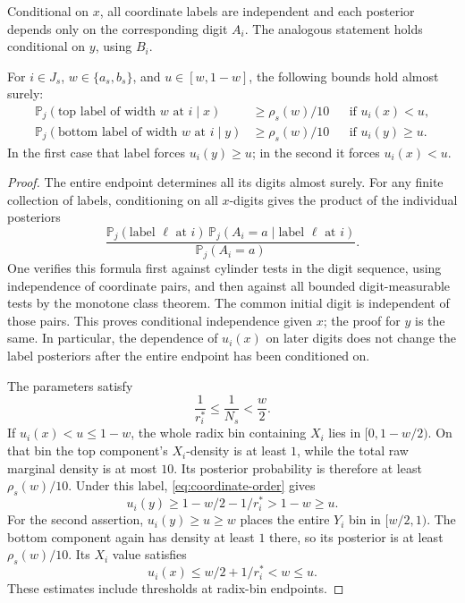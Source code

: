 \begin{lemma}
\label{lem:conditional-labels}
Conditional on $x$, all coordinate labels are independent and each
posterior depends only on the corresponding digit $A_i$. The analogous
statement holds conditional on $y$, using $B_i$.

For $i\in J_s$, $w\in\{a_s,b_s\}$, and $u\in[w,1-w]$, the following
bounds hold almost surely:
\begin{align}
 \mathbb P_j(\text{top label of width }w\text{ at }i\mid x)
   &\ge\rho_s(w)/10 &&\text{if }u_i(x)<u,
   \label{eq:conditional-crossing}\\
 \mathbb P_j(\text{bottom label of width }w\text{ at }i\mid y)
   &\ge\rho_s(w)/10 &&\text{if }u_i(y)\ge u.
   \label{eq:conditional-crossing-bottom}
\end{align}
In the first case that label forces $u_i(y)\ge u$; in the second it
forces $u_i(x)<u$.
\end{lemma}

\begin{proof}
The entire endpoint determines all its digits almost surely. For any
finite collection of labels, conditioning on all $x$-digits gives the
product of the individual posteriors
\[
 \frac{\mathbb P_j(\text{label }\ell\text{ at }i)\,
       \mathbb P_j(A_i=a\mid\text{label }\ell\text{ at }i)}
      {\mathbb P_j(A_i=a)}.
\]
One verifies this formula first against cylinder tests in the digit
sequence, using independence of coordinate pairs, and then against all
bounded digit-measurable tests by the monotone class theorem. The common
initial digit is independent of those pairs. This proves conditional
independence given $x$; the proof for $y$ is the same. In particular,
the dependence of $u_i(x)$ on later digits does not change the label
posteriors after the entire endpoint has been conditioned on.

The parameters satisfy
\[
 \frac1{r_i^*}\le\frac1{N_s}<\frac w2.
\]
If $u_i(x)<u\le1-w$, the whole radix bin containing $X_i$ lies in
$[0,1-w/2)$. On that bin the top component's $X_i$-density is at least
$1$, while the total raw marginal density is at most $10$. Its
posterior probability is therefore at least $\rho_s(w)/10$. Under this
label, \eqref{eq:coordinate-order} gives
\[
 u_i(y)\ge1-w/2-1/r_i^*>1-w\ge u.
\]
For the second assertion, $u_i(y)\ge u\ge w$ places the entire $Y_i$
bin in $[w/2,1)$. The bottom component again has density at least $1$
there, so its posterior is at least $\rho_s(w)/10$. Its $X_i$ value
satisfies
\[
 u_i(x)\le w/2+1/r_i^*<w\le u.
\]
These estimates include thresholds at radix-bin endpoints.
\end{proof}
